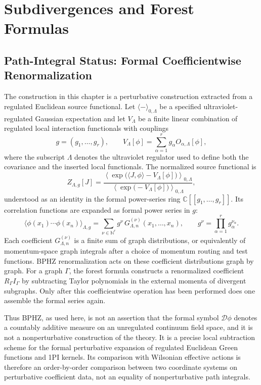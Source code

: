 \chapter{Subdivergences and Forest Formulas}
\label{ch:volume-ii-subdivergences-forest-formulas}
\ConventionsEuclidean

\section{Path-Integral Status: Formal Coefficientwise Renormalization}

The construction in this chapter is a perturbative construction extracted from
a regulated Euclidean source functional.  Let \(\langle-\rangle_{0,\Lambda}\)
be a specified ultraviolet-regulated Gaussian expectation and let
\(V_\Lambda\) be a finite linear combination of regulated local interaction
functionals with couplings
\[
  g=(g_1,\ldots,g_r),
  \qquad
  V_\Lambda[\phi]=\sum_{\alpha=1}^r g_\alpha O_{\alpha,\Lambda}[\phi],
\]
where the subscript \(\Lambda\) denotes the ultraviolet regulator used to
define both the covariance and the inserted local functionals.  The normalized
source functional is
\[
  Z_{\Lambda,g}[J]
  =
  \frac{\left\langle
    \exp\big(\langle J,\phi\rangle -V_\Lambda[\phi]\big)
  \right\rangle_{0,\Lambda}}
  {\left\langle
    \exp\big(-V_\Lambda[\phi]\big)
  \right\rangle_{0,\Lambda}},
\]
understood as an identity in the formal power-series ring
\(\mathbb C[[g_1,\ldots,g_r]]\).  Its correlation functions are expanded as
formal power series in \(g\):
\[
  \big\langle \phi(x_1)\cdots\phi(x_n)\big\rangle_{\Lambda,g}
  =
  \sum_{\nu\in\mathbb N^r}
  g^\nu\,
  G^{(\nu)}_{\Lambda,n}(x_1,\ldots,x_n),
  \qquad
  g^\nu=\prod_{\alpha=1}^r g_\alpha^{\nu_\alpha}.
\]
Each coefficient \(G^{(\nu)}_{\Lambda,n}\) is a finite sum of graph
distributions, or equivalently of momentum-space graph integrals after a
choice of momentum routing and test functions.  BPHZ renormalization acts on
these coefficient distributions graph by graph.  For a graph \(\Gamma\), the
forest formula constructs a renormalized coefficient \(R_\Gamma I_\Gamma\) by
subtracting Taylor polynomials in the external momenta of divergent subgraphs.
Only after this coefficientwise operation has been performed does one assemble
the formal series again.

Thus BPHZ, as used here, is not an assertion that the formal symbol
\(\mathcal D\phi\) denotes a countably additive measure on an unregulated
continuum field space, and it is not a nonperturbative construction of the
theory.  It is a precise local subtraction scheme for the formal perturbative
expansion of regulated Euclidean Green functions and 1PI kernels.  Its
comparison with Wilsonian effective actions is therefore an order-by-order
comparison between two coordinate systems on perturbative coefficient data,
not an equality of nonperturbative path integrals.


